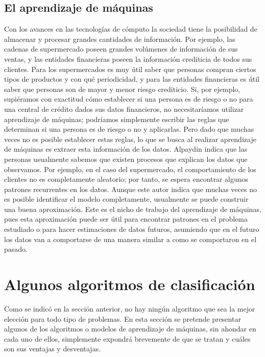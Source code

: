 \documentclass[a4paper, 11pt, oneside]{report}
\begin{document}
\subsection{El aprendizaje de máquinas}
\label{sect:machineLearning}
Con los avances en las tecnologías de cómputo la sociedad tiene la posibilidad de almacenar y procesar grandes cantidades de información. Por ejemplo, las cadenas de supermercado poseen grandes volúmenes de información de sus ventas, y las entidades financieras poseen la información crediticia de todos sus clientes. Para los supermercados es muy útil saber que personas compran ciertos tipos de productos y con qué periodicidad, y para las entidades financieras es útil saber que personas son de mayor y menor riesgo crediticio.
Si, por ejemplo, supiéramos con exactitud cómo establecer si una persona es de riesgo o no para una central de crédito dados sus datos financieros, no necesitaríamos utilizar
aprendizaje de máquinas; podríamos simplemente escribir las reglas que determinan si una persona es de riesgo o no y aplicarlas. Pero dado que muchas veces no es posible establecer estas reglas, lo que se busca al realizar aprendizaje de máquinas es extraer esta información de los datos.
Alpaydin indica que las personas usualmente sabemos que existen procesos que explican los datos que observamos. Por ejemplo, en el caso del supermercado, el comportamiento de los clientes no es completamente aleatorio; por tanto, se espera encontrar algunos patrones recurrentes en los datos. Aunque este autor indica que muchas veces no es posible identificar el modelo completamente, usualmente se puede construir una buena aproximación. Este es el nicho de trabajo del aprendizaje de máquinas, pues esta aproximación puede ser útil para encontrar patrones en el problema estudiado o para hacer estimaciones de datos futuros, asumiendo que en el futuro los datos van a comportarse de una manera similar a como se comportaron en el pasado.
\section{Algunos algoritmos de clasificación}
Como se indicó en la sección anterior, no hay ningún algoritmo que sea la mejor elección para todo tipo de problemas. En esta sección se pretende presentar algunos de los algoritmos o modelos de aprendizaje de máquinas, sin ahondar en cada uno de ellos, simplemente expondrá brevemente de que se tratan y cuáles son sus ventajas y desventajas.
\end{document}
